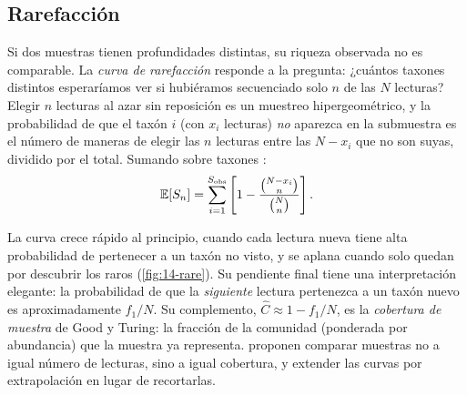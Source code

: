 \subsection{Rarefacción}

Si dos muestras tienen profundidades distintas, su riqueza observada no es comparable. La \emph{curva de rarefacción} responde a la pregunta: ¿cuántos taxones distintos esperaríamos ver si hubiéramos secuenciado solo $n$ de las $N$ lecturas? Elegir $n$ lecturas al azar sin reposición es un muestreo hipergeométrico, y la probabilidad de que el taxón $i$ (con $x_i$ lecturas) \emph{no} aparezca en la submuestra es el número de maneras de elegir las $n$ lecturas entre las $N-x_i$ que no son suyas, dividido por el total. Sumando sobre taxones \parencite{c14-chao2014}:
\begin{equation}\label{eq:14-rare}
\mathbb{E}[S_n] = \sum_{i=1}^{S_{\text{obs}}}\left[1 - \frac{\binom{N - x_i}{n}}{\binom{N}{n}}\right].
\end{equation}

\begin{simbolos}
\end{simbolos}

La curva crece rápido al principio, cuando cada lectura nueva tiene alta probabilidad de pertenecer a un taxón no visto, y se aplana cuando solo quedan por descubrir los raros (\cref{fig:14-rare}). Su pendiente final tiene una interpretación elegante: la probabilidad de que la \emph{siguiente} lectura pertenezca a un taxón nuevo es aproximadamente $f_1/N$. Su complemento, $\hat{C} \approx 1 - f_1/N$, es la \emph{cobertura de muestra} de Good y Turing: la fracción de la comunidad (ponderada por abundancia) que la muestra ya representa. \textcite{c14-chao2014} proponen comparar muestras no a igual número de lecturas, sino a igual cobertura, y extender las curvas por extrapolación en lugar de recortarlas.

